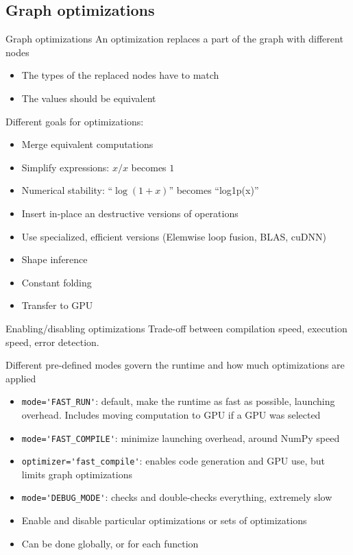 \documentclass[a4paper,9pt]{beamer}
\begin{document}
\subsection{Graph optimizations}

\begin{frame}{Graph optimizations}
  An optimization replaces a part of the graph with different nodes
  \begin{itemize}
    \item The types of the replaced nodes have to match
    \item The values should be equivalent
  \end{itemize}
  Different goals for optimizations:
  \begin{itemize}
    \item Merge equivalent computations
    \item Simplify expressions: $x / x$ becomes $1$
    \item Numerical stability: ``$\log (1 + x)$'' becomes ``log1p(x)''
    \item Insert in-place an destructive versions of operations
    \item Use specialized, efficient versions (Elemwise loop fusion, BLAS, cuDNN)
    \item Shape inference
    \item Constant folding
    \item Transfer to GPU
  \end{itemize}
\end{frame}

\begin{frame}[fragile]{Enabling/disabling optimizations}
  Trade-off between compilation speed, execution speed, error detection.

  Different pre-defined modes govern the runtime and how much optimizations are applied
  \begin{itemize}
    \item \verb|mode='FAST_RUN'|: default, make the runtime as fast as possible, launching overhead.
      Includes moving computation to GPU if a GPU was selected
    \item \verb|mode='FAST_COMPILE'|: minimize launching overhead, around NumPy speed
    \item \verb|optimizer='fast_compile'|: enables code generation and GPU use, but limits graph optimizations
    \item \verb|mode='DEBUG_MODE'|: checks and double-checks everything, extremely slow
    \item Enable and disable particular optimizations or sets of optimizations
    \item Can be done globally, or for each function
  \end{itemize}

\end{frame}
\end{document}
